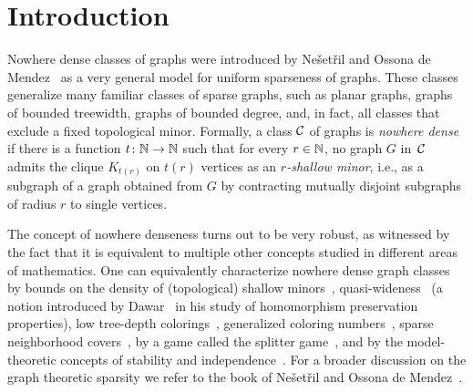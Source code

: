\section{Introduction}\label{sec:intro}

Nowhere dense classes of graphs were introduced 
by Ne\v set\v ril and Ossona de 
Mendez~\cite{nevsetvril2010first,nevsetvril2011nowhere} as a very 
general model
for uniform sparseness of graphs. These classes generalize many 
familiar classes of sparse graphs, such as planar graphs, graphs 
of bounded treewidth,  graphs of bounded degree, and, in fact, 
all classes that exclude a fixed 
topological minor.
Formally, a class $\mathcal{C}$ of graphs is {\em{nowhere dense}} if there is a function $t\colon \mathbb{N}\to \mathbb{N}$ such that for every $r\in \mathbb{N}$, no graph $G$ in~$\mathcal{C}$ admits the clique $K_{t(r)}$ on $t(r)$ vertices  as an {\em{$r$-shallow minor}},
i.e., as a subgraph of a graph obtained from $G$ by contracting mutually disjoint  subgraphs of radius $r$   to single vertices.


The concept of nowhere denseness
turns out to be very robust, as witnessed by the fact that it is equivalent 
to multiple other concepts studied in different areas of mathematics. 
One can equivalently characterize nowhere dense graph classes 
by bounds on the density of (topological) shallow 
minors~\cite{nevsetvril2010first,nevsetvril2011nowhere},
quasi-wideness~\cite{nevsetvril2011nowhere} (a notion introduced by
Dawar~\cite{dawar2010homomorphism} in his study of homomorphism
preservation properties), low tree-depth
colorings~\cite{nevsetvril2008grad}, generalized coloring
numbers~\cite{zhu2009coloring}, sparse neighborhood
covers~\cite{GroheKRSS15,grohe2014deciding}, by a game called the
splitter game~\cite{grohe2014deciding}, and by the model-theoretic
concepts of stability and independence~\cite{adler2014interpreting}.
For a broader discussion on the graph theoretic sparsity we refer to the book
of Ne\v{s}et\v{r}il and Ossona de Mendez~\cite{sparsity}.

